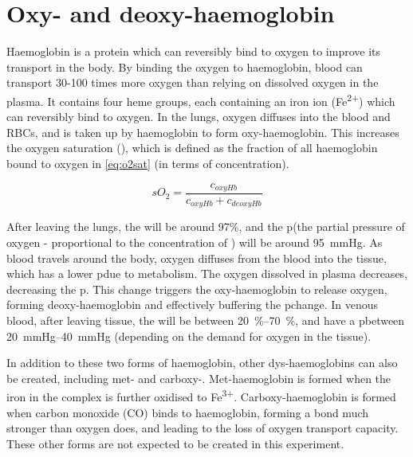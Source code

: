 \section{Oxy- and deoxy-haemoglobin}
\label{sec:back-po2so2}
Haemoglobin is a protein which can reversibly bind to oxygen to improve  its transport in the body. \cite{HallGuytonHallTextbook2015}
By binding the oxygen to haemoglobin, blood can transport 30-100 times more oxygen than relying on dissolved oxygen in the plasma.
It contains four heme groups, each containing an iron ion (Fe\textsuperscript{2+}) which can reversibly bind to oxygen.
In the lungs, oxygen diffuses into the blood and RBCs, and is taken up by haemoglobin to form oxy-haemoglobin.
This increases the oxygen saturation (\SOtwo), which is defined as the fraction of all haemoglobin bound to oxygen in \autoref{eq:o2sat} (in terms of concentration)\cite{ToffalettiMisconceptionsreportingoxygen2007}.

\begin{equation}
sO_2 = \frac{c_{oxyHb}}{c_{oxyHb} + c_{deoxyHb}}
\label{eq:o2sat}
\end{equation}

After leaving the lungs, the \SOtwo will be around 97\%, and the p\Otwo (the partial pressure of oxygen - proportional to the concentration of \Otwo) will be around \SI{95}{mmHg}.
As blood travels around the body, oxygen diffuses from the blood into the tissue, which has a lower p\Otwo due to metabolism.
The oxygen dissolved in plasma decreases, decreasing the p\Otwo.
This change triggers the oxy-haemoglobin to release oxygen, forming deoxy-haemoglobin and effectively buffering the p\Otwo change.
In venous blood, after leaving tissue, the \SOtwo will be between \SIrange{20}{70}{\percent}, and have a p\Otwo between \SIrange{20}{40}{mmHg} (depending on the demand for oxygen in the tissue). \cite{HallGuytonHallTextbook2015}

In addition to these two forms of haemoglobin, other dys-haemoglobins can also be created, including met- and carboxy-.
Met-haemoglobin is formed when the iron in the complex is further oxidised to Fe\textsuperscript{3+}.
Carboxy-haemoglobin is formed when carbon monoxide (CO) binds to haemoglobin, forming a bond much stronger than oxygen does, and leading to the loss of oxygen transport capacity.
These other forms are not expected to be created in this experiment.

